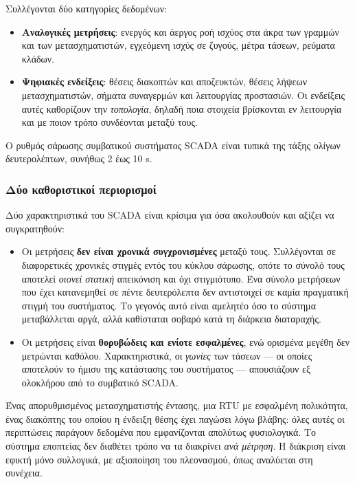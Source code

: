 Συλλέγονται δύο κατηγορίες δεδομένων:

\begin{itemize}
\item \textbf{Αναλογικές μετρήσεις}: ενεργός και άεργος ροή ισχύος στα άκρα των γραμμών και
      των μετασχηματιστών, εγχεόμενη ισχύς σε ζυγούς, μέτρα τάσεων, ρεύματα κλάδων.
\item \textbf{Ψηφιακές ενδείξεις}: θέσεις διακοπτών και αποζευκτών, θέσεις λήψεων
      μετασχηματιστών, σήματα συναγερμών και λειτουργίας προστασιών. Οι ενδείξεις αυτές
      καθορίζουν την \emph{τοπολογία}, δηλαδή ποια στοιχεία βρίσκονται εν λειτουργία και
      με ποιον τρόπο συνδέονται μεταξύ τους.
\end{itemize}

Ο ρυθμός σάρωσης συμβατικού συστήματος SCADA είναι τυπικά της τάξης ολίγων δευτερολέπτων,
συνήθως 2 έως 10 s.

\subsubsection*{Δύο καθοριστικοί περιορισμοί}

Δύο χαρακτηριστικά του SCADA είναι κρίσιμα για όσα ακολουθούν και αξίζει να συγκρατηθούν:

\begin{itemize}
\item Οι μετρήσεις \textbf{δεν είναι χρονικά συγχρονισμένες} μεταξύ τους. Συλλέγονται σε
      διαφορετικές χρονικές στιγμές εντός του κύκλου σάρωσης, οπότε το σύνολό τους αποτελεί
      \emph{οιονεί στατική} απεικόνιση και όχι στιγμιότυπο. Ένα σύνολο μετρήσεων που έχει
      κατανεμηθεί σε πέντε δευτερόλεπτα δεν αντιστοιχεί σε καμία πραγματική στιγμή του
      συστήματος. Το γεγονός αυτό είναι αμελητέο όσο το σύστημα μεταβάλλεται αργά, αλλά
      καθίσταται σοβαρό κατά τη διάρκεια διαταραχής.
\item Οι μετρήσεις είναι \textbf{θορυβώδεις και ενίοτε εσφαλμένες}, ενώ ορισμένα μεγέθη δεν
      μετρώνται καθόλου. Χαρακτηριστικά, οι \emph{γωνίες} των τάσεων — οι οποίες αποτελούν
      το ήμισυ της κατάστασης του συστήματος — απουσιάζουν εξ ολοκλήρου από το συμβατικό
      SCADA.
\end{itemize}

Ένας απορυθμισμένος μετασχηματιστής έντασης, μια RTU με εσφαλμένη πολικότητα, ένας
διακόπτης του οποίου η ένδειξη θέσης έχει παγώσει λόγω βλάβης: όλες αυτές οι περιπτώσεις
παράγουν δεδομένα που εμφανίζονται απολύτως φυσιολογικά. Το σύστημα εποπτείας δεν διαθέτει
τρόπο να τα διακρίνει \emph{ανά μέτρηση}. Η διάκριση είναι εφικτή μόνο συλλογικά, με
αξιοποίηση του πλεονασμού, όπως αναλύεται στη συνέχεια.

